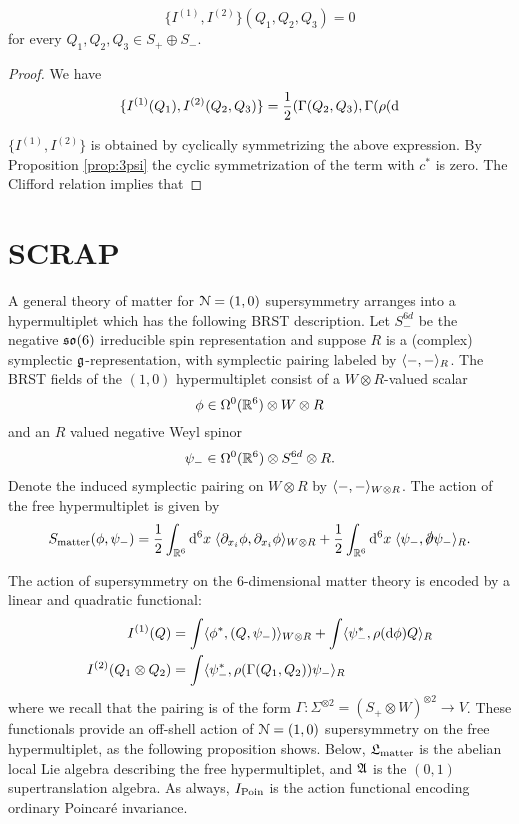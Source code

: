 \documentclass[10pt, oneside]{article}
\begin{document}
\begin{lemma}
\[\{I^{(1)}, I^{(2)}\}(Q_1, Q_2, Q_3) = 0\]
for every $Q_1, Q_2, Q_3\in S_+ \oplus S_-$.
\end{lemma}
\begin{proof}
We have
\begin{align*}
\{I^{(1)}(Q_1), I^{(2)}(Q_2, Q_3)\} = \frac{1}{2} (\Gamma(Q_2, Q_3), \Gamma(\rho({\rm d}
\end{align*}

$\{I^{(1)}, I^{(2)}\}$ is obtained by cyclically symmetrizing the above expression. By Proposition \ref{prop:3psi} the cyclic symmetrization of the term with $c^*$ is zero. The Clifford relation implies that

\end{proof}
\newpage

\section{SCRAP}

A general theory of matter for $\mathcal N = (1,0)$ supersymmetry arranges into a hypermultiplet which has the following BRST description.
Let $S_-^{6d}$ be the negative $\mathfrak{so}(6)$ irreducible spin representation and suppose $R$ is a (complex) symplectic $\mathfrak g$-representation, with symplectic pairing labeled by $\langle-,-\rangle_R$. 
The BRST fields of the $(1,0)$ hypermultiplet consist of a $W \otimes R$-valued scalar
\[
\phi \in \Omega^0(\mathbb R^6) \otimes W \otimes R
\]
and an $R$ valued negative Weyl spinor
\[
\psi_- \in \Omega^0(\mathbb R^6) \otimes S_-^{6d} \otimes R .
\]
Denote the induced symplectic pairing on $W \otimes R$ by $\langle-,-\rangle_{W \otimes R}$. 
The action of the free hypermultiplet is given by
\[
S_{\rm matter} (\phi, \psi_-) = \frac{1}{2} \int_{\RR^6} \d^6 x \; \<\partial_{x_i} \phi , \partial_{x_i} \phi\>_{W \otimes R} + \frac{1}{2} \int_{\RR^6} \d^6 x \;\<\psi_-, \sd \dd \psi_-\>_R .
\]

The action of supersymmetry on the $6$-dimensional matter theory is encoded by a linear and quadratic functional:
\begin{align*}
I^{(1)} (Q) & = \int \langle\phi^*, (Q, \psi_-)\rangle_{W \otimes R} + \int \langle\psi^*_-, \rho({\rm d} \phi) Q\rangle_R \\
I^{(2)} (Q_1 \otimes Q_2) & = \int \langle\psi^*_- , \rho(\Gamma(Q_1, Q_2)) \psi_-\rangle_R 
\end{align*}
where we recall that the pairing is of the form $\Gamma : \Sigma^{\otimes 2} = (S_+ \otimes W)^{\otimes 2} \to V$. 
These functionals provide an off-shell action of $\mathcal N = (1,0)$ supersymmetry on the free hypermultiplet, as the following proposition shows.
Below, $\mathfrak L_{\rm matter}$ is the abelian local Lie algebra describing the free hypermultiplet, and $\mathfrak{A}$ is the $(0,1)$ supertranslation algebra.  
As always, $I_{\rm Poin}$ is the action functional encoding ordinary Poincar\'{e} invariance. 
\end{document}
